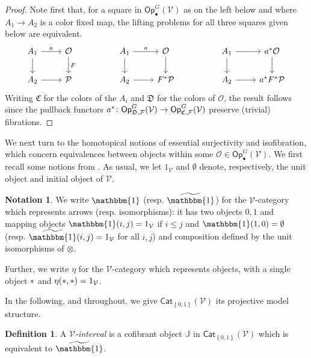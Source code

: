 \documentclass[a4paper,10pt
,draft
]{article}%
\numberwithin{equation}{section}
\numberwithin{figure}{section}
\theoremstyle{definition} %
\newtheorem{definition}[equation]{Definition}%
\newtheorem{notation}[equation]{Notation}%
\newcommand{\set}[1]{\left\{#1\right\}}%
\newcommand{\Cat}{\mathsf{Cat}}
\newcommand{\F}{\ensuremath{\mathcal F}}
\newcommand{\V}{\ensuremath{\mathcal V}}
\renewcommand{\O}{\ensuremath{\mathcal O}}
\renewcommand{\P}{\ensuremath{\mathcal P}}
\newcommand{\1}{\ensuremath{\mathbbm 1}}%
\begin{document}
\begin{proof}
Note first that,
for a square in $\mathsf{Op}^G_{\bullet}(\V)$
as on the left below and where $A_1 \to A_2$ is a color fixed map, 
the lifting problems for all three squares given below are equivalent.
\begin{equation}%
\begin{tikzcd}
A_1 \arrow[d] \arrow[r, "a"]
&
\mathcal{O} \arrow[d, "F"]
&&
A_1 \arrow[d] \arrow[r, "a"]
&
\mathcal{O} \arrow[d]
&&
A_1 \arrow[d] \arrow[r]
&
a^{\**} \mathcal{O} \arrow[d]
\\
A_2 \arrow[r]
&
\P
&&
A_2 \arrow[r]
&
F^{\**} \P
&&
A_2 \arrow[r]
&
a^{\**} F^{\**} \P
\end{tikzcd}
\end{equation}
Writing $\mathfrak{C}$ for the colors of the $A_i$ and
$\mathfrak{D}$ for the colors of $\O$,
the result follows since the pullback functors
$a^{\**} \colon \mathsf{Op}^G_{\mathfrak{D},\F}(\V)
\to \mathsf{Op}^G_{\mathfrak{C},\F}(\V)$
preserve (trivial) fibrations.
\end{proof}




We next turn to the homotopical notions of essential surjectivity and isofibration, 
which concern equivalences between objects within some 
$\O \in \mathsf{Op}^G_\bullet(\V)$.
We first recall some notions from \cite{BM13}.
As usual, we let $1_\V$ and $\emptyset$ denote, respectively, the unit object and initial object of $\V$.

\begin{notation}\label{1_NOT}
      We write $\mathbbm{1}$ (resp. $\widetilde{\mathbbm{1}}$)
      for the $\V$-category which represents arrows (resp. isomorphisms):
      it has two objects $0,1$
      and mapping objects
      $\mathbbm{1}(i,j)= 1_{\V}$
      if $i \leq j$
      and 
      $\mathbbm{1}(1,0)= \emptyset$
      (resp. $\widetilde{\mathbbm{1}}(i,j)= 1_{\V}$ for all $i,j$)
      and composition defined by the unit isomorphisms of $\otimes$.

      Further, we write $\eta$ for the $\V$-category which represents objects,
      with a single object $\**$ and $\eta(\**,\**) = 1_\V$.
\end{notation}


In the following, and throughout, 
we give $\Cat_{\set{0,1}}(\V)$
its projective model structure.

\begin{definition}
      A {\em $\V$-interval} is a cofibrant object $\mathbb{J}$ in $\Cat_{\set{0,1}}(\V)$
      which is equivalent to $\widetilde{\mathbbm{1}}$.
\end{definition}
\end{document}
